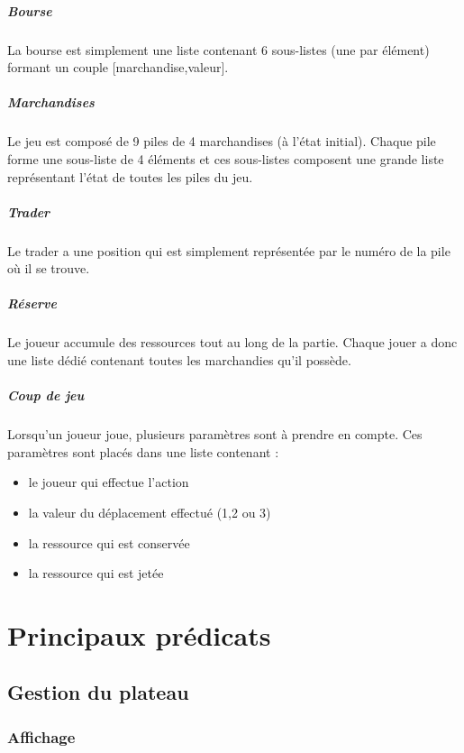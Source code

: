 \documentclass[11pt,a4paper,twoside,french,svgnames]{report}
\begin{document}
\paragraph{Bourse} La bourse est simplement une liste contenant 6 sous-listes (une par élément) formant un couple [marchandise,valeur].
\paragraph{Marchandises} Le jeu est composé de 9 piles de 4 marchandises (à l'état initial). Chaque pile forme une sous-liste de 4 éléments et ces sous-listes composent une grande liste représentant l'état de toutes les piles du jeu.
\paragraph{Trader} Le trader a une position qui est simplement représentée par le numéro de la pile où il se trouve.
\paragraph{Réserve}Le joueur accumule des ressources tout au long de la partie. Chaque jouer a donc une liste dédié contenant toutes les marchandies qu'il possède.
\paragraph{Coup de jeu}Lorsqu'un joueur joue, plusieurs paramètres sont à prendre en compte. Ces paramètres sont placés dans une liste contenant :
\begin{itemize}
	\item le joueur qui effectue l'action
    \item la valeur du déplacement effectué (1,2 ou 3)
    \item la ressource qui est conservée
    \item la ressource qui est jetée
\end{itemize}


\chapter{Principaux prédicats}
\section{Gestion du plateau}
\subsection{Affichage}
\end{document}

